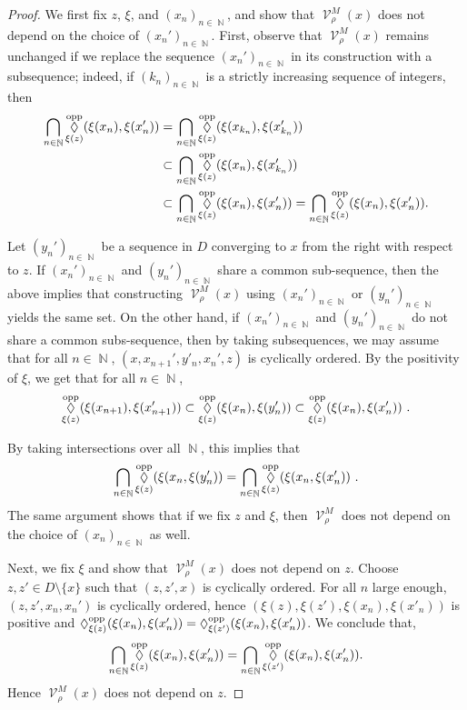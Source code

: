 \documentclass{amsart}
\theoremstyle{plain}
\theoremstyle{definition}
\DeclareMathOperator{\Diam}{\lozenge}
\newcommand{\bdext}{{\Vc^M_\rho}}
\DeclareMathOperator{\Vc}{\mathcal{V}}
\DeclareMathOperator{\Nb}{{\mathbb{N}}}
\newcommand{\opp}{\textnormal{opp}}
\newcommand{\1}{\mathbf{1}}
\begin{document}
\begin{proof}

We first fix $z$, $\xi$, and $(x_n)_{n\in\Nb}$, and show that $\bdext(x)$ does not depend on the choice of $(x_n')_{n\in\Nb}$. First, observe that $\Vc_{\rho}^M(x)$ remains unchanged if we replace the sequence $(x_n')_{n\in\Nb}$ in its construction with a subsequence; indeed, if $(k_n)_{n\in\Nb}$ is a strictly increasing sequence of integers, then 
\begin{align*}
\bigcap_{n\in\Nb} \Diam^\opp_{\xi(z)}(\xi(x_n),\xi(x_n'))&=\bigcap_{n\in\Nb} \Diam^\opp_{\xi(z)}(\xi(x_{k_n}),\xi(x_{k_n}'))\\
&\subset\bigcap_{n\in\Nb} \Diam^\opp_{\xi(z)}(\xi(x_n),\xi(x_{k_n}')) \\
&\subset\bigcap_{n\in\Nb} \Diam^\opp_{\xi(z)}(\xi(x_n),\xi(x_n'))=\bigcap_{n\in\Nb} \Diam^\opp_{\xi(z)}(\xi(x_n),\xi(x_n')).
\end{align*}


Let
$(y_n')_{n\in\Nb}$ be a sequence in $D$ converging to $x$ from the right with respect to $z$. If $(x_n')_{n\in\Nb}$ and $(y_n')_{n\in\Nb}$ share a common sub-sequence, then the above implies that constructing $\bdext(x)$ using $(x_n')_{n\in\Nb}$ or $(y_n')_{n\in\Nb}$ yields the same set. On the other hand, if $(x_n')_{n\in\Nb}$ and $(y_n')_{n\in\Nb}$ do not share a common subs-sequence, then by taking subsequences, we may assume that for all $n\in\Nb$, $(x, x_{n+1}',y'_n, x_n', z)$ is cyclically ordered. By the positivity of $\xi$, we get that for all $n\in\Nb$, 
    \begin{align*}
    \Diam^\opp_{\xi(z)}(\xi(x_{n+1}),\xi(x_{n+1}')) \subset\Diam^\opp_{\xi(z)}(\xi(x_n),\xi(y_n')) \subset \Diam^\opp_{\xi(z)}(\xi(x_n),\xi(x_n'))~.
    \end{align*}
    
By taking intersections over all $\Nb$, this implies that 
\[\bigcap_{n\in \Nb} \Diam^\opp_{\xi(z)}(\xi(x_n,\xi(y'_n))= \bigcap_{n\in \Nb} \Diam^\opp_{\xi(z)}(\xi(x_n,\xi(x'_n))~.\]
The same argument shows that if we fix $z$ and $\xi$, then $\bdext$ does not depend on the choice of $(x_n)_{n\in\Nb}$ as well.

Next, we fix $\xi$ and show that $\bdext(x)$ does not depend on $z$. Choose $z,z'\in D\setminus\{x\}$ such that $(z,z',x)$ is cyclically ordered. For all $n$ large enough, $(z,z',x_n,x_n')$ is cyclically ordered, hence $(\xi(z),\xi(z'),\xi(x_n),\xi(x'_n))$ is positive and $\Diam^\opp_{\xi(z)}(\xi(x_n),\xi(x_n'))= \Diam^\opp_{\xi(z')}(\xi(x_n),\xi(x_n'))$. We conclude that,
\[\bigcap_{n\in\Nb} \Diam^\opp_{\xi(z)}(\xi(x_n),\xi(x_n'))=\bigcap_{n\in\Nb} \Diam^\opp_{\xi(z')}(\xi(x_n),\xi(x_n')).\]
Hence $\bdext(x)$ does not depend on $z$.


\end{proof}
\end{document}
